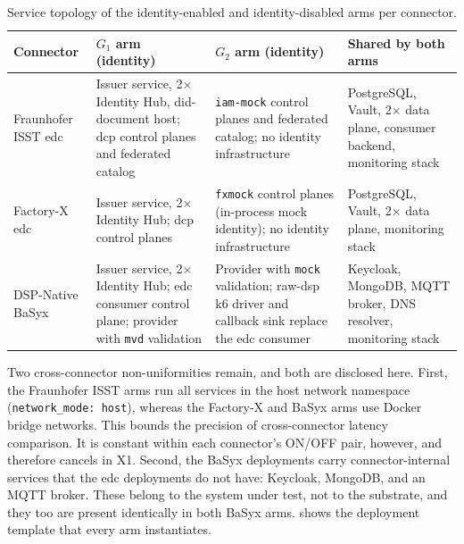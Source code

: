 \begin{table}[ht]
    \centering
    \small
    \setlength{\tabcolsep}{4pt}
    \begin{tabularx}{\textwidth}{@{}>{\raggedright\arraybackslash}p{2.35cm} >{\raggedright\arraybackslash}X >{\raggedright\arraybackslash}X >{\raggedright\arraybackslash}p{3.3cm}@{}}
        \toprule
        \textbf{Connector} & \textbf{$G_1$ arm (identity)} & \textbf{$G_2$ arm (identity)} & \textbf{Shared by both arms} \\
        \midrule
        Fraunhofer ISST \gls{edc} & Issuer service, 2$\times$ Identity Hub, \gls{did}-document host; \gls{dcp} control planes and federated catalog & \texttt{iam-mock} control planes and federated catalog; no identity infrastructure & PostgreSQL, Vault, 2$\times$ data plane, consumer backend, monitoring stack \\
        \addlinespace
        Factory-X \gls{edc} & Issuer service, 2$\times$ Identity Hub; \gls{dcp} control planes & \texttt{fxmock} control planes (in-process mock identity); no identity infrastructure & PostgreSQL, Vault, 2$\times$ data plane, monitoring stack \\
        \addlinespace
        DSP-Native BaSyx & Issuer service, 2$\times$ Identity Hub; \gls{edc} consumer control plane; provider with \texttt{mvd} validation & Provider with \texttt{mock} validation; raw-\gls{dsp} k6 driver and callback sink replace the \gls{edc} consumer & Keycloak, MongoDB, MQTT broker, DNS resolver, monitoring stack \\
        \bottomrule
    \end{tabularx}
    \caption[Per-connector topology of the two deployment arms]{Service topology of the identity-enabled and identity-disabled arms per connector.}
    \label{tab:arm-topology}
\end{table}

Two cross-connector non-uniformities remain, and both are disclosed here. First, the Fraunhofer ISST arms run all services in the host network namespace (\texttt{network\_mode: host}), whereas the Factory-X and BaSyx arms use Docker bridge networks. This bounds the precision of cross-connector latency comparison. It is constant within each connector's ON/OFF pair, however, and therefore cancels in X1. Second, the BaSyx deployments carry connector-internal services that the \gls{edc} deployments do not have: Keycloak, MongoDB, and an MQTT broker. These belong to the system under test, not to the substrate, and they too are present identically in both BaSyx arms.  shows the deployment template that every arm instantiates.

